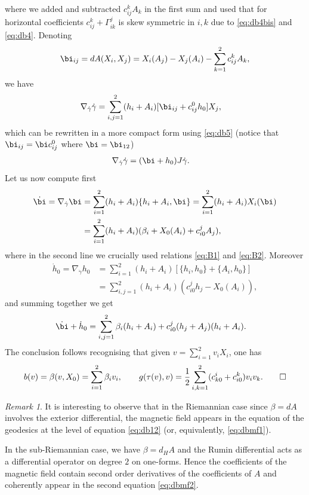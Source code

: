 \documentclass{amsart}
\theoremstyle{plain}
\theoremstyle{definition}
\theoremstyle{remark}
\newtheorem{remark}[thm]{Remark}
\newcommand{\diff}{d}%
\begin{document}
 where we added and subtracted $c_{ij}^{k} A_{k}$ in the first sum and used that for horizontal coefficients
$c_{ij}^{k}+\Gamma_{ik}^{j}$ 
is skew symmetric in $i,k$ due to \eqref{eq:db4bis} and \eqref{eq:db4}. Denoting
$$\bi_{ij}=dA(X_{i},X_{j})=X_{i}(A_{j})-X_{j}(A_{i})-\sum_{k=1}^{2}c_{ij}^{k}A_{k},$$
we have
\begin{align}\label{eq:db11}
\nabla_{\dot \gamma}\dot \gamma&=\sum_{i,j=1}^{2}(h_{i}+A_{i})[\bi_{ij} + c_{ij}^{0} h_{0}]X_{j} ,
\end{align}
which can be rewritten in a more compact form using \eqref{eq:db5} (notice that $\bi_{ij}=\bi c_{ij}^{0}$ where $\bi=\bi_{12}$)
\begin{align} \label{eq:db12}
\nabla_{\dot \gamma}\dot \gamma&=(\bi+h_{0})J\dot \gamma.
\end{align} 
Let us now compute first
\begin{align*}
\dot \bi=\nabla_{\dot \gamma} \bi&=\sum_{i=1}^{2}(h_{i}+A_{i})\{h_{i}+A_{i},\bi\}=\sum_{i=1}^{2}(h_{i}+A_{i})X_{i}(\bi)\\
&=\sum_{i=1}^{2}(h_{i}+A_{i})(\beta_{i}+X_{0}(A_{i})+c_{i0}^{j}A_{j}),
\end{align*}
where in the second line we crucially used relations \eqref{eq:B1} and \eqref{eq:B2}. Moreover 
\begin{align*}
\dot h_{0}=\nabla_{\dot \gamma} h_{0}&
=\sum_{i=1}^{2}(h_{i}+A_{i})[\{h_{i},h_{0}\}+{\{A_{i},h_{0}\}}]\\
&=\sum_{i,j=1}^{2}(h_{i}+A_{i})(c_{i0}^{j}h_{j}-X_{0}(A_{i})),
\end{align*}
and summing together we get
\begin{align*}
\dot \bi + \dot h_{0}
&=\sum_{i,j=1}^{2}\beta_{i} (h_{i}+A_{i})+c_{i0}^{j}(h_{j}+A_{j})(h_{i}+A_{i}).
\end{align*}
The conclusion follows recognising that given $v=\sum_{i=1}^{2}v_{i}X_{i}$, one has
\begin{equation}
b(v)=\beta(v,X_{0})=\sum_{i=1}^{2}\beta_{i}v_{i},\qquad 
g(\tau(v),v)=\frac{1}{2}\sum_{i,k=1}^{2}(c_{k0}^i + c_{i0}^k) v_{i}v_{k}. \qedhere
\end{equation}


\begin{remark} \label{r:dbrmf}
It is interesting to observe that in the Riemannian case since $\beta=dA$ involves the exterior differential, the magnetic field appears in the equation of the geodesics  at the level of equation \eqref{eq:db12} (or, equivalently, \eqref{eq:dbmf1}). 

In the sub-Riemannian case, we have $\beta=\diff_{H}A$ and the Rumin differential acts as a differential operator on degree $2$ on one-forms. Hence the coefficients of the magnetic field contain second order derivatives of the coefficients of $A$ and coherently appear in the second equation \eqref{eq:dbmf2}.
\end{remark}
\end{document}
